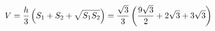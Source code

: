 \documentclass[preview]{standalone}
\begin{document}
\begin{align*}
\special{dvisvgm:raw <g id='unique000'>}V=\frac{h}{3}\left(S_1+S_2+\sqrt{S_1 S_2}\right)=\frac{\sqrt{3}}{3}\left(\frac{9\sqrt{3}}{2}+2\sqrt{3}+3\sqrt{3}\right)\special{dvisvgm:raw </g>}
\end{align*}
\end{document}
